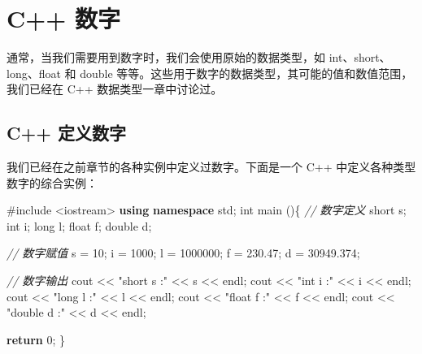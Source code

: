 \documentclass[
]{article}
\newenvironment{Shaded}{}{}
\newcommand{\CommentTok}[1]{\textcolor[rgb]{0.38,0.63,0.69}{\textit{#1}}}
\newcommand{\ControlFlowTok}[1]{\textcolor[rgb]{0.00,0.44,0.13}{\textbf{#1}}}
\newcommand{\DataTypeTok}[1]{\textcolor[rgb]{0.56,0.13,0.00}{#1}}
\newcommand{\DecValTok}[1]{\textcolor[rgb]{0.25,0.63,0.44}{#1}}
\newcommand{\FloatTok}[1]{\textcolor[rgb]{0.25,0.63,0.44}{#1}}
\newcommand{\ImportTok}[1]{#1}
\newcommand{\KeywordTok}[1]{\textcolor[rgb]{0.00,0.44,0.13}{\textbf{#1}}}
\newcommand{\NormalTok}[1]{#1}
\newcommand{\OperatorTok}[1]{\textcolor[rgb]{0.40,0.40,0.40}{#1}}
\newcommand{\PreprocessorTok}[1]{\textcolor[rgb]{0.74,0.48,0.00}{#1}}
\newcommand{\StringTok}[1]{\textcolor[rgb]{0.25,0.44,0.63}{#1}}
\begin{document}
\hypertarget{c-ux6570ux5b57}{%
\section{C++ 数字}\label{c-ux6570ux5b57}}

通常，当我们需要用到数字时，我们会使用原始的数据类型，如
int、short、long、float 和 double
等等。这些用于数字的数据类型，其可能的值和数值范围，我们已经在 C++
数据类型一章中讨论过。

\hypertarget{c-ux5b9aux4e49ux6570ux5b57}{%
\subsection{C++ 定义数字}\label{c-ux5b9aux4e49ux6570ux5b57}}

我们已经在之前章节的各种实例中定义过数字。下面是一个 C++
中定义各种类型数字的综合实例：

\begin{Shaded}
\begin{Highlighting}[]
\PreprocessorTok{\#include }\ImportTok{\textless{}iostream\textgreater{}}
\KeywordTok{using} \KeywordTok{namespace}\NormalTok{ std}\OperatorTok{;}
\DataTypeTok{int}\NormalTok{ main }\OperatorTok{()\{}
   \CommentTok{// 数字定义}
   \DataTypeTok{short}\NormalTok{  s}\OperatorTok{;}
   \DataTypeTok{int}\NormalTok{    i}\OperatorTok{;}
   \DataTypeTok{long}\NormalTok{   l}\OperatorTok{;}
   \DataTypeTok{float}\NormalTok{  f}\OperatorTok{;}
   \DataTypeTok{double}\NormalTok{ d}\OperatorTok{;}
   
   \CommentTok{// 数字赋值}
\NormalTok{   s }\OperatorTok{=} \DecValTok{10}\OperatorTok{;}      
\NormalTok{   i }\OperatorTok{=} \DecValTok{1000}\OperatorTok{;}    
\NormalTok{   l }\OperatorTok{=} \DecValTok{1000000}\OperatorTok{;} 
\NormalTok{   f }\OperatorTok{=} \FloatTok{230.47}\OperatorTok{;}  
\NormalTok{   d }\OperatorTok{=} \FloatTok{30949.374}\OperatorTok{;}
   
   \CommentTok{// 数字输出}
\NormalTok{   cout }\OperatorTok{\textless{}\textless{}} \StringTok{"short  s :"} \OperatorTok{\textless{}\textless{}}\NormalTok{ s }\OperatorTok{\textless{}\textless{}}\NormalTok{ endl}\OperatorTok{;}
\NormalTok{   cout }\OperatorTok{\textless{}\textless{}} \StringTok{"int    i :"} \OperatorTok{\textless{}\textless{}}\NormalTok{ i }\OperatorTok{\textless{}\textless{}}\NormalTok{ endl}\OperatorTok{;}
\NormalTok{   cout }\OperatorTok{\textless{}\textless{}} \StringTok{"long   l :"} \OperatorTok{\textless{}\textless{}}\NormalTok{ l }\OperatorTok{\textless{}\textless{}}\NormalTok{ endl}\OperatorTok{;}
\NormalTok{   cout }\OperatorTok{\textless{}\textless{}} \StringTok{"float  f :"} \OperatorTok{\textless{}\textless{}}\NormalTok{ f }\OperatorTok{\textless{}\textless{}}\NormalTok{ endl}\OperatorTok{;}
\NormalTok{   cout }\OperatorTok{\textless{}\textless{}} \StringTok{"double d :"} \OperatorTok{\textless{}\textless{}}\NormalTok{ d }\OperatorTok{\textless{}\textless{}}\NormalTok{ endl}\OperatorTok{;}
 
   \ControlFlowTok{return} \DecValTok{0}\OperatorTok{;}
\OperatorTok{\}}
\end{Highlighting}
\end{Shaded}
\end{document}
